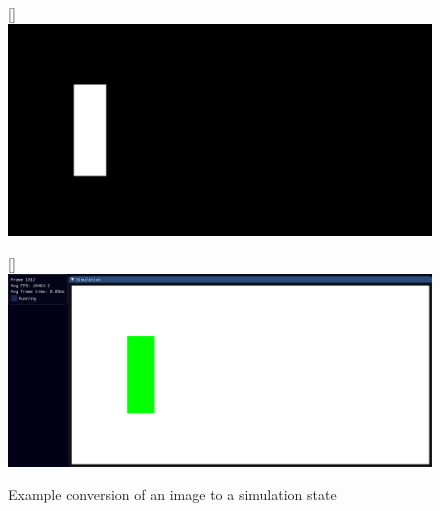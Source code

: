 \begin{figure}[ht]
    \centering

    [\linewidth]{\includegraphics[]{Ch42Design/figures/simple_layout.png}
    }
    
    [\linewidth]{\includegraphics[width=0.5\linewidth]{Ch42Design/figures/example_sim_of_simple_layout.png}
    }
    
    \caption{Example conversion of an image to a simulation state}
    \label{fig:ExampleMakeinput}
\end{figure}